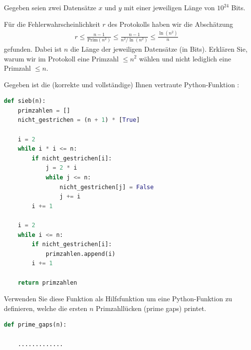 \begin{questions}
\question Gegeben seien zwei Datensätze $x$ und $y$ mit einer jeweiligen Länge von $10^{24}$ Bits. 
\droptotalpoints

\question[2]
Für die Fehlerwahrscheinlichkeit $r$ des Protokolls haben wir die Abschätzung
\begin{align*}
    r \leq \frac{n-1}{\text{Prim}(n^2)}\leq \frac{n-1}{n^2/\ln(n^2)}\leq\frac{\ln(n^2)}{n}
\end{align*}
gefunden. Dabei ist $n$ die Länge der jeweiligen Datensätze (in Bits). Erklären Sie, warum wir im Protokoll eine Primzahl $\leq n^2$ wählen und nicht lediglich eine Primzahl $\leq n$.

\clearpage
\question[2]
Gegeben ist die (korrekte und vollständige) Ihnen vertraute Python-Funktion :
\begin{lstlisting}[language=Python,caption=Sieb,numbers=none]
def sieb(n):
    primzahlen = []
    nicht_gestrichen = (n + 1) * [True]

    i = 2
    while i * i <= n:
        if nicht_gestrichen[i]:
            j = 2 * i
            while j <= n:
                nicht_gestrichen[j] = False
                j += i
        i += 1

    i = 2
    while i <= n:
        if nicht_gestrichen[i]:
            primzahlen.append(i)
        i += 1

    return primzahlen
\end{lstlisting}
Verwenden Sie diese Funktion als Hilfsfunktion um eine Python-Funktion  zu definieren, welche die ersten $n$ Primzahllücken (prime gaps) printet.
\begin{lstlisting}[language=Python,caption=prime gaps (noch zu vervollständigen),numbers=none]
def prime_gaps(n):

    .............


\end{lstlisting}
\end{questions}
